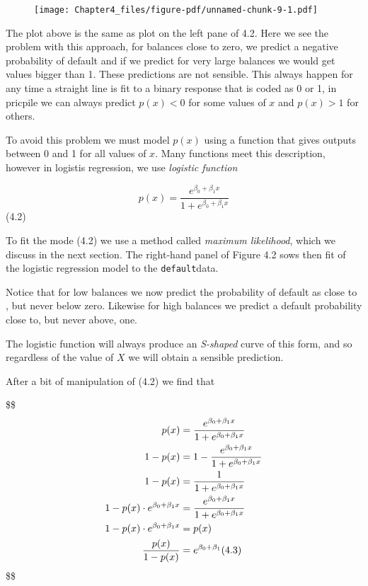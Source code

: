\documentclass[
  letterpaper,
  DIV=11,
  numbers=noendperiod]{scrreprt}
\begin{document}
\begin{figure}[H]

{\centering \texttt{[image: Chapter4\_files/figure-pdf/unnamed-chunk-9-1.pdf]}

}

\end{figure}

The plot above is the same as plot on the left pane of 4.2. Here we see
the problem with this approach, for balances close to zero, we predict a
negative probability of default and if we predict for very large
balances we would get values bigger than 1. These predictions are not
sensible. This always happen for any time a straight line is fit to a
binary response that is coded as 0 or 1, in pricpile we can always
predict \(p(x)<0\) for some values of \(x\) and \(p(x)>1\) for others.

To avoid this problem we must model \(p(x)\) using a function that gives
outputs between 0 and 1 for all values of \(x\). Many functions meet
this description, however in logistis regression, we use \emph{logistic
function}

\[
p(x) = \frac{e^{\beta_0 + \beta_1 x}}{1 + e^{\beta_0 + \beta_1 x}}
\] (4.2)

To fit the mode (4.2) we use a method called \emph{maximum likelihood},
which we discuss in the next section. The right-hand panel of Figure 4.2
sows then fit of the logistic regression model to the
\texttt{default}data.

Notice that for low balances we now predict the probability of default
as close to , but never below zero. Likewise for high balances we
predict a default probability close to, but never above, one.

The logistic function will always produce an \emph{S-shaped} curve of
this form, and so regardless of the value of \(X\) we will obtain a
sensible prediction.

After a bit of manipulation of (4.2) we find that

\$\$ \begin{align}
p(x) &= \frac{e^{\beta_0 + \beta_1 x}}{1 + e^{\beta_0 + \beta_1 x}} \\

1-p(x) &= 1- \frac{e^{\beta_0 + \beta_1 x}}{1 + e^{\beta_0 + \beta_1 x}} \\

1- p(x) &= \frac{1}{1 + e^{\beta_0 + \beta_1 x}}  \\

1- p(x) \cdot e^{\beta_0 + \beta_1x} &= \frac{e^{\beta_0 + \beta_1 x}}{1 + e^{\beta_0 + \beta_1 x}}\\

1-p(x) \cdot e^{\beta_0 + \beta_1 x} &= p(x) \\

\frac{p(x)}{1-p(x)} &= e^{\beta_0 + \beta_1} \space \space \space \space \space \space \space \space \space \space (4.3)

\end{align} \$\$
\end{document}
